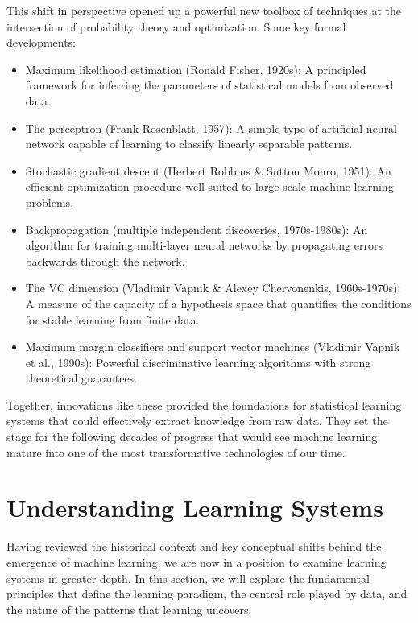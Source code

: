 \documentclass[
  9pt,
  letterpaper,
  abstract,
  titlepage]{scrbook}
\begin{document}
This shift in perspective opened up a powerful new toolbox of techniques
at the intersection of probability theory and optimization. Some key
formal developments:

\begin{itemize}
\item
  Maximum likelihood estimation (Ronald Fisher, 1920s): A principled
  framework for inferring the parameters of statistical models from
  observed data.
\item
  The perceptron (Frank Rosenblatt, 1957): A simple type of artificial
  neural network capable of learning to classify linearly separable
  patterns.
\item
  Stochastic gradient descent (Herbert Robbins \& Sutton Monro, 1951):
  An efficient optimization procedure well-suited to large-scale machine
  learning problems.
\item
  Backpropagation (multiple independent discoveries, 1970s-1980s): An
  algorithm for training multi-layer neural networks by propagating
  errors backwards through the network.
\item
  The VC dimension (Vladimir Vapnik \& Alexey Chervonenkis,
  1960s-1970s): A measure of the capacity of a hypothesis space that
  quantifies the conditions for stable learning from finite data.
\item
  Maximum margin classifiers and support vector machines (Vladimir
  Vapnik et al., 1990s): Powerful discriminative learning algorithms
  with strong theoretical guarantees.
\end{itemize}

Together, innovations like these provided the foundations for
statistical learning systems that could effectively extract knowledge
from raw data. They set the stage for the following decades of progress
that would see machine learning mature into one of the most
transformative technologies of our time.

\section{Understanding Learning
Systems}\label{understanding-learning-systems}

Having reviewed the historical context and key conceptual shifts behind
the emergence of machine learning, we are now in a position to examine
learning systems in greater depth. In this section, we will explore the
fundamental principles that define the learning paradigm, the central
role played by data, and the nature of the patterns that learning
uncovers.
\end{document}
